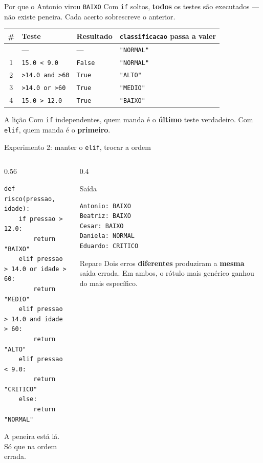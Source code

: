 \documentclass[aspectratio=169]{beamer}
\newcommand{\code}[1]{\texttt{\small #1}}
\begin{document}
\begin{frame}{Por que o Antonio virou \texttt{BAIXO}}
  Com \code{if} soltos, \textbf{todos} os testes são executados ---
  não existe peneira. Cada acerto sobrescreve o anterior.

  \vspace{0.25cm}
  \begin{center}
  \scriptsize
  \begin{tabular}{@{}clll@{}}
    \toprule
    \textbf{\#} & \textbf{Teste} & \textbf{Resultado} & \textbf{\code{classificacao} passa a valer} \\
    \midrule
     & --- & --- & \code{"NORMAL"} \\
    1 & \code{15.0 < 9.0} & \code{False} & \code{"NORMAL"} \\
    2 & \code{>14.0 and >60} & \code{True} & \code{"ALTO"} \\
    3 & \code{>14.0 or >60} & \code{True} & \code{"MEDIO"} \\
    4 & \code{15.0 > 12.0} & \code{True} & \code{"BAIXO"} \\
    \bottomrule
  \end{tabular}
  \end{center}

  \vspace{0.25cm}
  \begin{block}{A lição}
    Com \code{if} independentes, quem manda é o \textbf{último} teste
    verdadeiro. Com \code{elif}, quem manda é o \textbf{primeiro}.
  \end{block}
\end{frame}

\begin{frame}[fragile]{Experimento 2: manter o \texttt{elif}, trocar a ordem}
  \begin{columns}[T]
    \begin{column}{0.56\textwidth}
\begin{lstlisting}
def risco(pressao, idade):
    if pressao > 12.0:
        return "BAIXO"
    elif pressao > 14.0 or idade > 60:
        return "MEDIO"
    elif pressao > 14.0 and idade > 60:
        return "ALTO"
    elif pressao < 9.0:
        return "CRITICO"
    else:
        return "NORMAL"
\end{lstlisting}
      {\small A peneira está lá. Só que na ordem errada.}
    \end{column}
    \begin{column}{0.4\textwidth}
      \begin{alertblock}{Saída}
\begin{lstlisting}[style=saida]
Antonio: BAIXO
Beatriz: BAIXO
Cesar: BAIXO
Daniela: NORMAL
Eduardo: CRITICO
\end{lstlisting}
      \end{alertblock}
      \begin{block}{Repare}
        Dois erros \textbf{diferentes} produziram a \textbf{mesma}
        saída errada. Em ambos, o rótulo mais genérico ganhou do
        mais específico.
      \end{block}
    \end{column}
  \end{columns}
\end{frame}
\end{document}
